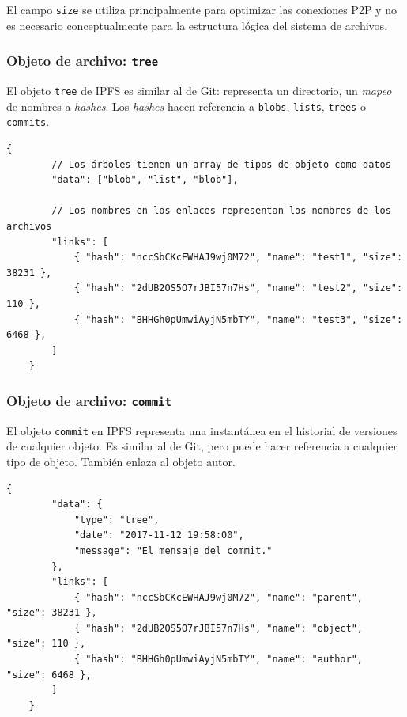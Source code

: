 \documentclass[12pt]{article} %
\begin{document}
El campo \texttt{size} se utiliza principalmente para optimizar las conexiones P2P y no es necesario conceptualmente para la estructura lógica del sistema de archivos.


\subsubsection{Objeto de archivo: \texttt{tree}} %
\label{ssub:objeto_de_archivo_tree}

El objeto \texttt{tree} de IPFS es similar al de Git: representa un directorio, un \textit{mapeo} de nombres a \textit{hashes}. Los \textit{hashes} hacen referencia a \texttt{blobs}, \texttt{lists}, \texttt{trees} o \texttt{commits}.

\begin{lstlisting}[caption={Estructura JSON de un \texttt{tree}.}]
	{
		// Los árboles tienen un array de tipos de objeto como datos
		"data": ["blob", "list", "blob"],

		// Los nombres en los enlaces representan los nombres de los archivos
		"links": [
			{ "hash": "nccSbCKcEWHAJ9wj0M72", "name": "test1", "size": 38231 },
			{ "hash": "2dUB2OS5O7rJBI57n7Hs", "name": "test2", "size": 110 },
			{ "hash": "BHHGh0pUmwiAyjN5mbTY", "name": "test3", "size": 6468 },
		]
	}
\end{lstlisting}


\subsubsection{Objeto de archivo: \texttt{commit}} %
\label{ssub:objeto_de_archivo_commit}

El objeto \texttt{commit} en IPFS representa una instantánea en el historial de versiones de cualquier objeto. Es similar al de Git, pero puede hacer referencia a cualquier tipo de objeto. También enlaza al objeto autor.

\begin{lstlisting}[caption={Estructura JSON de un \texttt{commit}.}]
	{
		"data": {
			"type": "tree",
			"date": "2017-11-12 19:58:00",
			"message": "El mensaje del commit."
		},
		"links": [
			{ "hash": "nccSbCKcEWHAJ9wj0M72", "name": "parent", "size": 38231 },
			{ "hash": "2dUB2OS5O7rJBI57n7Hs", "name": "object", "size": 110 },
			{ "hash": "BHHGh0pUmwiAyjN5mbTY", "name": "author", "size": 6468 },
		]
	}
\end{lstlisting}
\end{document}

